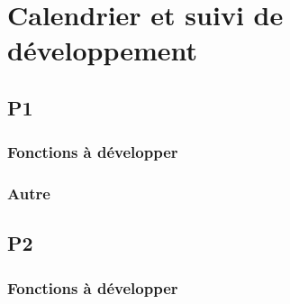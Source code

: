 \documentclass[a4paper]{article}
\begin{document}
    \section{Calendrier et suivi de développement}
        \subsection{P1}
            \subsubsection{Fonctions à développer}
            \subsubsection{Autre}
        \subsection{P2}
            \subsubsection{Fonctions à développer}
\end{document}
